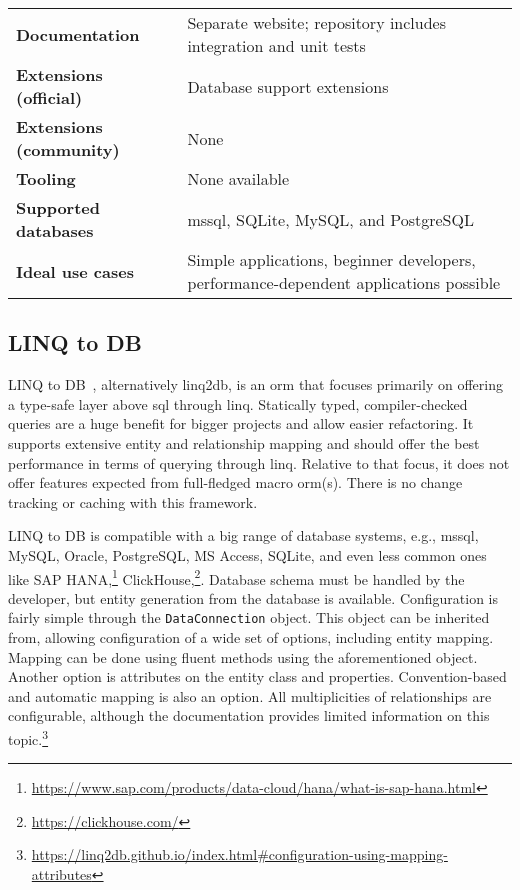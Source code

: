 {\begin{landscape}
\begin{table}[p]
\begin{tabular}{
>{\raggedright\arraybackslash}p{40.00mm}
>{\arraybackslash}p{150.00mm}
}
\textbf{Documentation} & Separate website; repository includes integration and unit tests\\
\textbf{Extensions (official)} & Database support extensions \\
\textbf{Extensions (community)} & None \\
\textbf{Tooling} & None available \\
\textbf{Supported databases} & \acrshort{mssql}, SQLite, MySQL, and PostgreSQL \\
\textbf{Ideal use cases} & Simple applications, beginner developers, performance-dependent applications possible \\
\bottomrule
\end{tabular}
\end{table}
\end{landscape}
}

\subsection{LINQ to DB}
\label{section:linqToDb}

LINQ to DB~\cite{linq2db, linq2dbRepo}, alternatively linq2db, is an \acrshort{orm} that focuses primarily on offering a type-safe layer above \acrshort{sql} through \acrshort{linq}. Statically typed, compiler-checked queries are a huge benefit for bigger projects and allow easier refactoring. It supports extensive entity and relationship mapping and should offer the best performance in terms of querying through \acrshort{linq}. Relative to that focus, it does not offer features expected from full-fledged macro \acrshort{orm}(s). There is no change tracking or caching with this framework.

LINQ to DB is compatible with a big range of database systems, e.g., \acrshort{mssql}, MySQL, Oracle, PostgreSQL, MS Access, SQLite, and even less common ones like SAP HANA,\footnote{\url{https://www.sap.com/products/data-cloud/hana/what-is-sap-hana.html}} ClickHouse,\footnote{\url{https://clickhouse.com/}}. Database schema must be handled by the developer, but entity generation from the database is available. Configuration is fairly simple through the \texttt{DataConnection} object. This object can be inherited from, allowing configuration of a wide set of options, including entity mapping. Mapping can be done using fluent methods using the aforementioned object. Another option is attributes on the entity class and properties. Convention-based and automatic mapping is also an option. All multiplicities of relationships are configurable, although the documentation provides limited information on this topic.\footnote{\url{https://linq2db.github.io/index.html\#configuration-using-mapping-attributes}}

